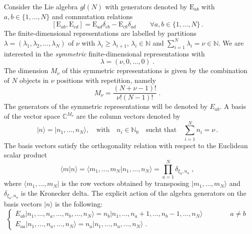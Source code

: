 \documentclass[10pt]{article}
\numberwithin{equation}{section}
\numberwithin{equation}{subsection}
\newcommand{\co}{\;,}
\newcommand{\dt}{\;.}
\newcommand{\EE}{\mathrm{E}}
\newcommand{\twoj}{\nu}
\begin{document}
Consider the Lie algebra $gl(N)$ with generators denoted by $\EE_{ab}$ with $a,b\in \{1,\ldots,N\}$ and commutation relations
\begin{equation}\label{eq:comgl}
\left[\EE_{ab},\EE_{cd}\right]=\EE_{ad}\delta_{cb}-\EE_{cb}\delta_{ad}\qquad \forall a,b\in \{1,\ldots,N\}\,.
\end{equation}
The finite-dimensional representations are labelled by partitions $\lambda=(\lambda_1,\lambda_2,\ldots,\lambda_N)$ of $\nu$ with  $\lambda_i\geq \lambda_{i+1}$,  $\lambda_i\in \mathbb{N}$ and $\sum_{i=1}^N \lambda_i = \nu\in\mathbb{N}$.  
We are interested in the {\em symmetric} finite-dimensional representations with 
\begin{equation}\label{eq:dynkin}
    \lambda=(\twoj,0,\ldots,0) \;.
\end{equation} 
The dimension $M_\twoj$ of this symmetric representations is given by the combination of $N$ objects in $\twoj$ positions with repetition, namely
\begin{equation}
	M_\twoj= \frac{(N+\twoj-1)!}{\twoj  !(N-1)!}\dt
\end{equation} 
The generators of the symmetric representations will be denoted by $E_{ab}$.
A basis of the vector space $\mathbb{C}^{M_\twoj}$ are the column vectors denoted by
\begin{equation}
  |n\rangle=  |n_{1},\ldots,n_{N}\rangle,\quad \text{with}\quad n_{i}\in\mathbb{N}_{0}\quad \text{sucht that}\quad \sum_{i=1}^{N}n_{i}=\nu\,.
\end{equation}
{\color{red}
The basis vectors satisfy the orthogonality relation with respect to the Euclidean scalar product 
\begin{equation}\label{ortho}
   \langle m|n \rangle =\langle m_{1},\ldots,m_{N}|n_{1},\ldots,n_{N}\rangle=\prod_{a=1}^{N}\delta_{\xi_{a},n_{a}}\co
\end{equation}
where  $ \langle m_{1},\ldots,m_{N}|$ is the row vectors obtained by transposing $|m_{1},\ldots,m_{N}\rangle$ and $\delta_{\xi_{a},n_{a}}$ is the Kronecker delta. 
}
The explicit action of the algebra generators on the basis  vectors $|n\rangle$ is the following:
\begin{equation}\label{actionE}
	\begin{cases}
		E_{ab}|n_{1},\ldots,n_{a},\ldots,n_{b},\ldots,n_{N}\rangle =n_{b}|n_{1},\ldots,n_{a}+1,\ldots,n_{b}-1,\ldots,n_{N}\rangle\qquad\qquad a\neq b\\[0.1cm]
		E_{aa}|n_{1},\ldots,n_{a},\ldots,n_{N}\rangle = n_{a} |n_{1},\ldots,n_{a},\ldots,n_{N}\rangle\dt
	\end{cases}
\end{equation}  
\end{document}
